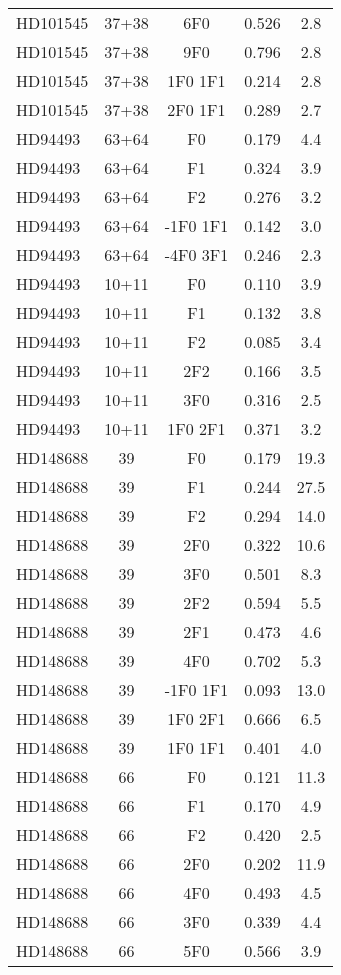 \begin{table*}
\begin{tabular}{l c c c c}
HD101545 & 37+38 & 6F0 & 0.526 & 2.8\\ 
HD101545 & 37+38 & 9F0 & 0.796 & 2.8\\ 
HD101545 & 37+38 & 1F0 1F1 & 0.214 & 2.8\\ 
HD101545 & 37+38 & 2F0 1F1 & 0.289 & 2.7\\ 
\hline
HD94493 & 63+64 & F0 & 0.179 & 4.4\\ 
HD94493 & 63+64 & F1 & 0.324 & 3.9\\ 
HD94493 & 63+64 & F2 & 0.276 & 3.2\\ 
HD94493 & 63+64 & -1F0 1F1 & 0.142 & 3.0\\ 
HD94493 & 63+64 & -4F0 3F1 & 0.246 & 2.3\\ 
\hline
HD94493 & 10+11 & F0 & 0.110 & 3.9\\ 
HD94493 & 10+11 & F1 & 0.132 & 3.8\\ 
HD94493 & 10+11 & F2 & 0.085 & 3.4\\ 
HD94493 & 10+11 & 2F2 & 0.166 & 3.5\\ 
HD94493 & 10+11 & 3F0 & 0.316 & 2.5\\ 
HD94493 & 10+11 & 1F0 2F1 & 0.371 & 3.2\\ 
\hline
HD148688 & 39 & F0 & 0.179 & 19.3\\ 
HD148688 & 39 & F1 & 0.244 & 27.5\\ 
HD148688 & 39 & F2 & 0.294 & 14.0\\ 
HD148688 & 39 & 2F0 & 0.322 & 10.6\\ 
HD148688 & 39 & 3F0 & 0.501 & 8.3\\ 
HD148688 & 39 & 2F2 & 0.594 & 5.5\\ 
HD148688 & 39 & 2F1 & 0.473 & 4.6\\ 
HD148688 & 39 & 4F0 & 0.702 & 5.3\\ 
HD148688 & 39 & -1F0 1F1 & 0.093 & 13.0\\ 
HD148688 & 39 & 1F0 2F1 & 0.666 & 6.5\\ 
HD148688 & 39 & 1F0 1F1 & 0.401 & 4.0\\ 
\hline
HD148688 & 66 & F0 & 0.121 & 11.3\\ 
HD148688 & 66 & F1 & 0.170 & 4.9\\ 
HD148688 & 66 & F2 & 0.420 & 2.5\\ 
HD148688 & 66 & 2F0 & 0.202 & 11.9\\ 
HD148688 & 66 & 4F0 & 0.493 & 4.5\\ 
HD148688 & 66 & 3F0 & 0.339 & 4.4\\ 
HD148688 & 66 & 5F0 & 0.566 & 3.9\\ 

\end{tabular}
\end{table*}
